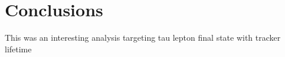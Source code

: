 \clearpage
\chapter{Conclusions}\label{sec:conclusions}
This was an interesting analysis targeting tau lepton final state with tracker lifetime
